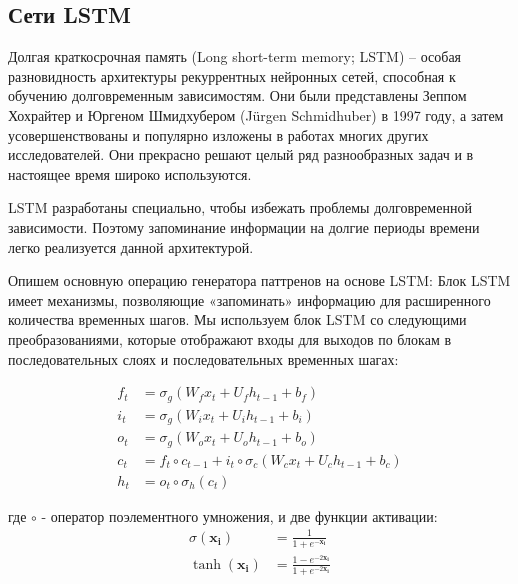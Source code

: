 \subsection{Сети LSTM}

Долгая краткосрочная память (Long short-term memory; LSTM) – особая разновидность архитектуры рекуррентных нейронных сетей, способная к обучению долговременным зависимостям. Они были представлены Зеппом Хохрайтер и Юргеном Шмидхубером (Jürgen Schmidhuber)\cite{hochreiter1997long} в 1997 году, а затем усовершенствованы и популярно изложены в работах многих других исследователей. Они прекрасно решают целый ряд разнообразных задач и в настоящее время широко используются.

LSTM разработаны специально, чтобы избежать проблемы долговременной зависимости. Поэтому запоминание информации на долгие периоды времени легко реализуется данной архитектурой.

Опишем основную операцию генератора паттренов на основе LSTM\cite{gers1999learning}:
Блок LSTM имеет механизмы, позволяющие «запоминать» информацию для расширенного количества временных шагов. Мы используем блок LSTM со следующими преобразованиями, которые отображают входы для выходов по блокам в последовательных слоях и последовательных временных шагах:

\[
{\displaystyle {\begin{aligned}
	f_{t} & =\sigma _{g}(W_{f}x_{t}+U_{f}h_{t-1}+b_{f})                               \\
	i_{t} & =\sigma _{g}(W_{i}x_{t}+U_{i}h_{t-1}+b_{i})                               \\
	o_{t} & =\sigma _{g}(W_{o}x_{t}+U_{o}h_{t-1}+b_{o})                               \\
	c_{t} & =f_{t}\circ c_{t-1}+i_{t}\circ \sigma _{c}(W_{c}x_{t}+U_{c}h_{t-1}+b_{c}) \\
	h_{t} & =o_{t}\circ \sigma _{h}(c_{t})
\end{aligned}}}
\]

где $ \circ $ - оператор поэлементного умножения, и две функции активации:
\[\begin{aligned}
 \sigma(\mathbf{x_i}) & =\frac{1}{1+e^{-\mathbf{x_i}}} \, \\
 \tanh(\mathbf{x_i}) & =\frac{1-e^{-2\mathbf{x_i}}}{1+e^{-2\mathbf{x_i}}} \\
 \end{aligned}
\]

